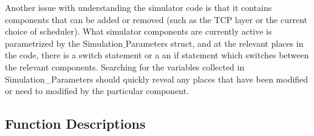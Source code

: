 \documentclass[11pt]{article}%
\begin{document}
Another issue with understanding the simulator code is that it contains components that can be added or removed (such as the TCP layer or the current choice of scheduler).  What simulator components are currently active is parametrized by the Simulation$\_$Parameters struct, and at the relevant places in the code, there is a switch statement or a an if statement which switches between the relevant components.  Searching for the variables collected in Simulation\_Parameters should quickly reveal any places that have been modified or need to modified by the particular component.

\subsection{Function Descriptions}
\end{document}
